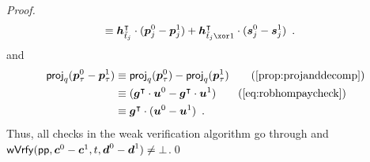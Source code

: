 \begin{proof}
\begin{align*}
  \equiv{}&\vec{h}_{\tilde t_j}^\transpose\cdot (\vec{p}^0_{j} - \vec{p}^1_{j}) + \vec{h}_{\tilde t_j\xor 1}^\transpose \cdot (\vec{s}^0_{j} - \vec{s}^1_{j})\enspace.
  \end{align*}
  and
  \begin{align*}
    \proj_q(\vec{p}^0_{\tau}-\vec{p}^1_{\tau})
    \equiv{}&\proj_q(\vec{p}^0_{\tau})-\proj_q(\vec{p}^1_{\tau})\tag{\autoref{prop:projanddecomp}}\\
    \equiv{}&(\vec{g}^\transpose\cdot \vec{u}^0 - \vec{g}^\transpose \cdot \vec{u}^1)\tag{\autoref{eq:robhompaycheck}}\\
  \equiv{}&\vec{g}^\transpose\cdot (\vec{u}^0 - \vec{u}^1)\enspace.
  \end{align*}
  Thus, all checks in the weak verification algorithm go through and $\mathsf{wVrfy}(\mathsf{pp},\boldsymbol{c}^0-\boldsymbol{c}^1, t,\boldsymbol{d}^0-\boldsymbol{d}^1)\neq\bot$.\qed
\end{proof}

